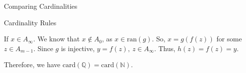 \documentclass[10pt]{extarticle}
\begin{document}
\begin{problem}{Comparing Cardinalities}
\begin{problem}{Cardinality Rules}
\begin{description}
\begin{description}
              If $x\in A_{\infty}$. We know that $x\notin A_0$, as $x\in \textrm{ran}(g)$. So, $x = g(f(z))$ for some $z\in A_{m-1}$. Since $g$ is injective, $y = f(z),~z\in A_{\infty}$. Thus, $h(z) = f(z) = y$.
          \end{description}
      \end{description}
    \end{problem}
      Therefore, we have $\text{card}(\mathbb{Q}) = \text{card}(\mathbb{N})$.
  \end{problem}
\end{document}
